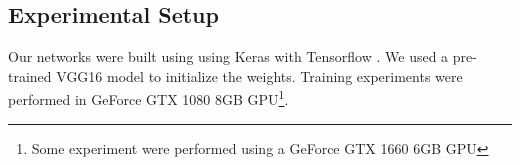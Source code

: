 \subsection{Experimental Setup}
\label{cap5_experimental_setup}

Our networks were built using using Keras \cite{chollet2015keras} with Tensorflow \cite{tensorflow2015-whitepaper}. 
We used a pre-trained VGG16 model to initialize the weights. 
Training experiments were performed in GeForce GTX 1080 8GB GPU\footnote{Some experiment were performed using a GeForce GTX 1660 6GB GPU}.


% 
% 
%   

